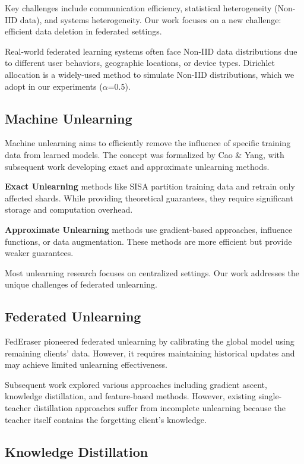 \documentclass[10pt,twocolumn]{article}
\begin{document}
Key challenges include communication efficiency, statistical heterogeneity (Non-IID data), and systems heterogeneity. Our work focuses on a new challenge: efficient data deletion in federated settings.

Real-world federated learning systems often face Non-IID data distributions due to different user behaviors, geographic locations, or device types. Dirichlet allocation is a widely-used method to simulate Non-IID distributions, which we adopt in our experiments ($\alpha$=0.5).

\subsection{Machine Unlearning}

Machine unlearning aims to efficiently remove the influence of specific training data from learned models. The concept was formalized by Cao \& Yang, with subsequent work developing exact and approximate unlearning methods.

\textbf{Exact Unlearning} methods like SISA partition training data and retrain only affected shards. While providing theoretical guarantees, they require significant storage and computation overhead.

\textbf{Approximate Unlearning} methods use gradient-based approaches, influence functions, or data augmentation. These methods are more efficient but provide weaker guarantees.

Most unlearning research focuses on centralized settings. Our work addresses the unique challenges of federated unlearning.

\subsection{Federated Unlearning}

FedEraser pioneered federated unlearning by calibrating the global model using remaining clients' data. However, it requires maintaining historical updates and may achieve limited unlearning effectiveness.

Subsequent work explored various approaches including gradient ascent, knowledge distillation, and feature-based methods. However, existing single-teacher distillation approaches suffer from incomplete unlearning because the teacher itself contains the forgetting client's knowledge.

\subsection{Knowledge Distillation}
\end{document}
